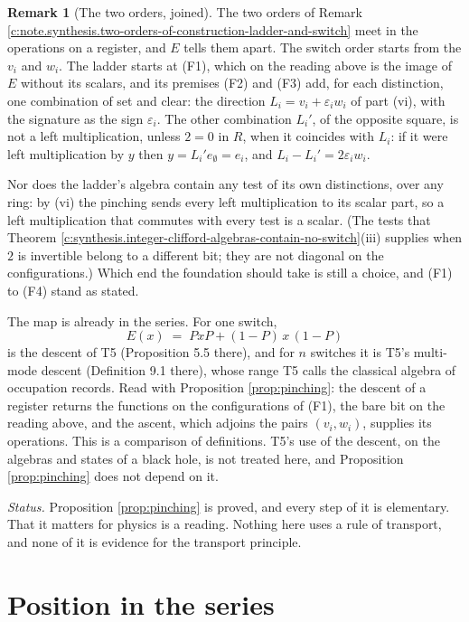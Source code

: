 \documentclass[11pt]{article}
\theoremstyle{definition}
\newtheorem{remark}[theorem]{Remark}
\theoremstyle{plain}
\begin{document}
\begin{remark}[The two orders, joined]\label{c:note.geometry-first.two-orders-joined}
The two orders of Remark \ref{c:note.synthesis.two-orders-of-construction-ladder-and-switch} meet in the operations on a register, and $E$ tells them apart. The switch order starts from the $v_{i}$ and $w_{i}$. The ladder starts at (F1), which on the reading above is the image of $E$ without its scalars, and its premises (F2) and (F3) add, for each distinction, one combination of set and clear: the direction $L_{i} = v_{i} + \varepsilon_{i}w_{i}$ of part (vi), with the signature as the sign $\varepsilon_{i}$. The other combination $L_{i}'$, of the opposite square, is not a left multiplication, unless $2 = 0$ in $R$, when it coincides with $L_{i}$: if it were left multiplication by $y$ then $y = L_{i}'e_{\emptyset} = e_{i}$, and $L_{i} - L_{i}' = 2\varepsilon_{i}w_{i}$.

Nor does the ladder's algebra contain any test of its own distinctions, over any ring: by (vi) the pinching sends every left multiplication to its scalar part, so a left multiplication that commutes with every test is a scalar. (The tests that Theorem \ref{c:synthesis.integer-clifford-algebras-contain-no-switch}(iii) supplies when $2$ is invertible belong to a different bit; they are not diagonal on the configurations.) Which end the foundation should take is still a choice, and (F1) to (F4) stand as stated.

The map is already in the series. For one switch,
\[
E(x) \;=\; PxP + (1-P)\,x\,(1-P)
\]
is the descent of T5 \cite{ButlerT5} (Proposition 5.5 there), and for $n$ switches it is T5's multi-mode descent (Definition 9.1 there), whose range T5 calls the classical algebra of occupation records. Read with Proposition \ref{prop:pinching}: the descent of a register returns the functions on the configurations of (F1), the bare bit on the reading above, and the ascent, which adjoins the pairs $(v_{i}, w_{i})$, supplies its operations. This is a comparison of definitions. T5's use of the descent, on the algebras and states of a black hole, is not treated here, and Proposition \ref{prop:pinching} does not depend on it.

\emph{Status.} Proposition \ref{prop:pinching} is proved, and every step of it is elementary. That it matters for physics is a reading. Nothing here uses a rule of transport, and none of it is evidence for the transport principle.
\end{remark}

\section{Position in the series}
\end{document}
